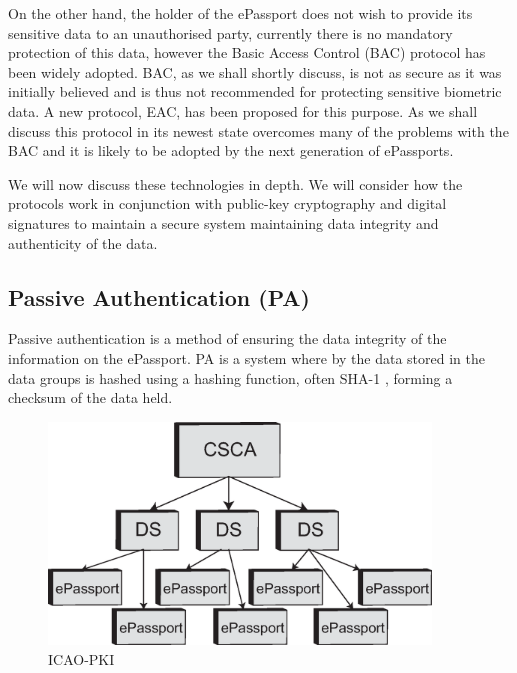 \documentclass[12pt]{article}
\begin{document}
On the other hand, the holder of the ePassport does not wish to provide its sensitive data to an unauthorised party, currently there is no mandatory protection of this data, however the Basic Access Control (BAC) protocol has been widely adopted. BAC, as we shall shortly discuss, is not as secure as it was initially believed and is thus not recommended for protecting sensitive biometric data. A new protocol, EAC, has been proposed for this purpose. As we shall discuss this protocol in its newest state overcomes many of the problems with the BAC and it is likely to be adopted by the next generation of ePassports.

We will now discuss these technologies in depth. We will consider how the protocols work in conjunction with public-key cryptography and digital signatures to maintain a secure system maintaining data integrity and authenticity of the data.  

\subsection{Passive Authentication (PA)}
\label{sec:PA}
Passive authentication is a method of ensuring the data integrity of the information on the ePassport. PA is a system where by the data stored in the data groups is hashed using a hashing function, often SHA-1 \cite{Avoine:2008wf}, forming a checksum of the data held. 

\begin{figure}
\centering
\includegraphics[width=4in]{IACO-PKI.eps}
\caption{ICAO-PKI}
\label{fig:ICAO-PKI}
\end{figure}
\end{document}
